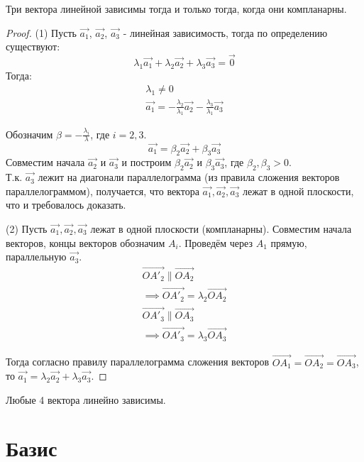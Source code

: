 \begin{theorem}
  Три вектора линейной зависимы тогда и только тогда, когда они компланарны.
\end{theorem}
\begin{proof}
  (1) Пусть $\vec{a_1}$, $\vec{a_2}$, $\vec{a_3}$ - линейная зависимость, тогда по определению существуют:
  \[
  \lambda_1 \vec{a_1} + \lambda_2 \vec{a_2} + \lambda_3 \vec{a_3} = \vec{0}
  \] 
  Тогда:
  \begin{gather*}
    \lambda_1 \neq 0 \\
    \vec{a_1} = -\frac{\lambda_2}{\lambda_1} \vec{a_2} - \frac{\lambda_3}{\lambda_1} \vec{a_3}
  \end{gather*}

  Обозначим $\beta = -\frac{\lambda_i}{\lambda}$, где $i = 2, 3$. \\
  \[
    \vec{a_1} = \beta_2 \vec{a_2} + \beta_3 \vec{a_3}
  \]
  Совместим начала $\vec{a_2}$ и $\vec{a_3}$ и построим $\beta_2 \vec{a_2}$ и $\beta_3 \vec{a_3}$, где $\beta_2, \beta_3 > 0$. \\
  Т.к. $\vec{a_3}$ лежит на диагонали параллелограмма (из правила сложения векторов параллелограммом), получается, что вектора $\vec{a_1}, \vec{a_2}, \vec{a_3}$ лежат в одной плоскости, что и требовалось доказать.

  (2) Пусть $\vec{a_1}, \vec{a_2}, \vec{a_3}$ лежат в одной плоскости (компланарны). Совместим начала векторов, концы векторов обозначим $A_i$. Проведём через $A_1$ прямую, параллельную $\vec{a_3}$.
  \begin{gather*}
    \overrightarrow{OA'_2} \parallel \overrightarrow{OA_2} \\
    \implies \overrightarrow{OA'_2} = \lambda_2 \overrightarrow{OA_2} \\
    \overrightarrow{OA'_3} \parallel \overrightarrow{OA_3} \\
    \implies \overrightarrow{OA'_3} = \lambda_3 \overrightarrow{OA_3}
  \end{gather*}

  Тогда согласно правилу параллелограмма сложения векторов $\overrightarrow{OA_1} = \overrightarrow{OA_2} = \overrightarrow{OA_3}$, то $\vec{a_1} = \lambda_2 \vec{a_2} + \lambda_3 \vec{a_3}$.
\end{proof}

\begin{theorem}
  Любые 4 вектора линейно зависимы.
\end{theorem}

\section{Базис}


